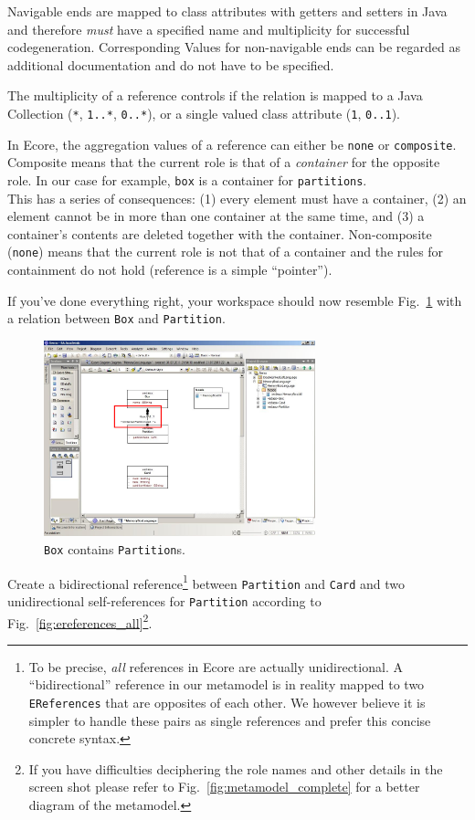 Navigable ends are mapped to class attributes with getters and setters in Java
and therefore \emph{must} have a specified name and  multiplicity for successful
codegeneration.  
Corresponding Values for non-navigable ends can  be regarded as additional
documentation and do not have to be specified.
 
The multiplicity of a reference controls if the relation is mapped to a Java
Collection (\texttt{*},  \texttt{1..*}, \texttt{0..*}), or a single valued class
attribute (\texttt{1}, \texttt{0..1}).

In Ecore, the aggregation values of a reference can either be \texttt{none} or
\texttt{com\-po\-site}.  Composite means that the current role is that of a
\emph{container} for the opposite role.  In our case for example, \texttt{box}
is a container for \texttt{partitions}.\\  This has a series of
consequences: (1) every element must have a container, (2) an element cannot be
in more than one container at the same time, and (3) a container's contents are
deleted together with the container.  Non-composite (\texttt{none}) means that
the current role is not that of a container and the rules for containment do not
hold (reference is a simple ``pointer'').

\clearpage

If you've done everything right, your workspace should now resemble
Fig.~\ref{fig:ereference_completed} with a relation between \texttt{Box} and
\texttt{Partition}.

\begin{figure}[htbp] 
	\centering
  \includegraphics[width=0.7\textwidth]{pics/memBox28.png}
	\caption{\texttt{Box} contains \texttt{Partition}s.}
	\label{fig:ereference_completed}
\end{figure}

Create a bidirectional reference\footnote{To be precise, \emph{all} references
in Ecore are actually unidirectional.  A ``bidirectional'' reference in our
metamodel is in reality mapped to two \texttt{EReferences} that are opposites of
each other.  
We however believe it is simpler to handle these pairs as single references and
prefer this concise concrete syntax.} between \texttt{Partition} and \texttt{Card}
and two unidirectional self-references for \texttt{Partition} according to
Fig.~\ref{fig:ereferences_all}\footnote{If you have difficulties deciphering
the role names and other details in the screen shot please refer to
Fig.~\ref{fig:metamodel_complete} for a better diagram of the metamodel.}.
 
